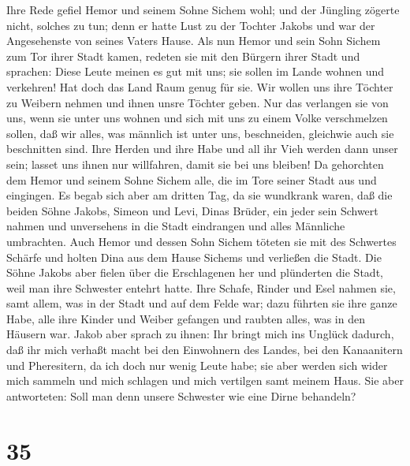  Ihre Rede gefiel Hemor und seinem Sohne Sichem wohl;
 und der Jüngling zögerte nicht, solches zu tun; denn er
hatte Lust zu der Tochter Jakobs und war der Angesehenste von seines
Vaters Hause.  Als nun Hemor und sein Sohn Sichem zum Tor
ihrer Stadt kamen, redeten sie mit den Bürgern ihrer Stadt und sprachen:
 Diese Leute meinen es gut mit uns; sie sollen im Lande
wohnen und verkehren! Hat doch das Land Raum genug für sie. Wir wollen
uns ihre Töchter zu Weibern nehmen und ihnen unsre Töchter geben.
 Nur das verlangen sie von uns, wenn sie unter uns wohnen
und sich mit uns zu einem Volke verschmelzen sollen, daß wir alles, was
männlich ist unter uns, beschneiden, gleichwie auch sie beschnitten
sind.  Ihre Herden und ihre Habe und all ihr Vieh werden
dann unser sein; lasset uns ihnen nur willfahren, damit sie bei uns
bleiben!  Da gehorchten dem Hemor und seinem Sohne Sichem
alle, die im Tore seiner Stadt aus und eingingen.  Es
begab sich aber am dritten Tag, da sie wundkrank waren, daß die beiden
Söhne Jakobs, Simeon und Levi, Dinas Brüder, ein jeder sein Schwert
nahmen und unversehens in die Stadt eindrangen und alles Männliche
umbrachten.  Auch Hemor und dessen Sohn Sichem töteten
sie mit des Schwertes Schärfe und holten Dina aus dem Hause Sichems und
verließen die Stadt.  Die Söhne Jakobs aber fielen über
die Erschlagenen her und plünderten die Stadt, weil man ihre Schwester
entehrt hatte.  Ihre Schafe, Rinder und Esel nahmen sie,
samt allem, was in der Stadt und auf dem Felde war;  dazu
führten sie ihre ganze Habe, alle ihre Kinder und Weiber gefangen und
raubten alles, was in den Häusern war.  Jakob aber sprach
zu ihnen: Ihr bringt mich ins Unglück dadurch, daß ihr mich verhaßt
macht bei den Einwohnern des Landes, bei den Kanaanitern und
Pheresitern, da ich doch nur wenig Leute habe; sie aber werden sich
wider mich sammeln und mich schlagen und mich vertilgen samt meinem
Haus.  Sie aber antworteten: Soll man denn unsere
Schwester wie eine Dirne behandeln?

\hypertarget{section-34}{%
\section{35}\label{section-34}}

